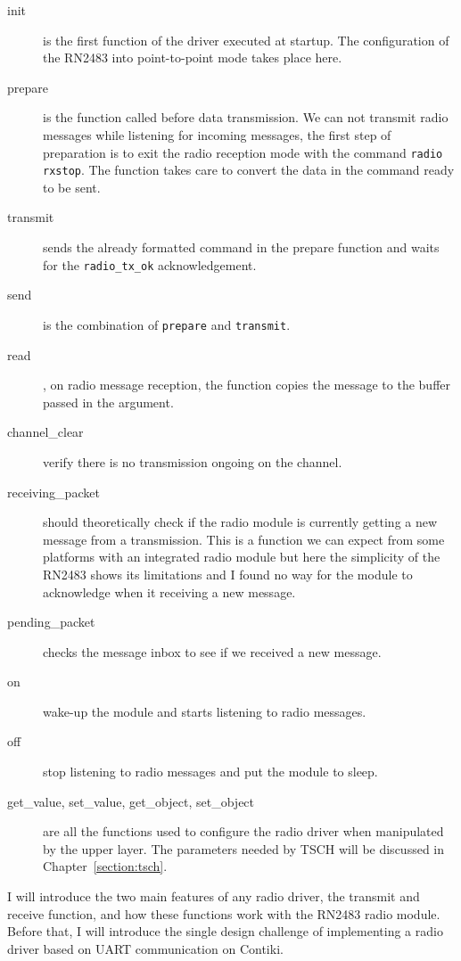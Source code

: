 \begin{description}
  \item[init] is the first function of the driver executed at startup.
    The configuration of the RN2483 into point-to-point mode takes place here.
  \item[prepare] is the function called before data transmission.
    We can not transmit radio messages while listening for incoming messages, the
    first step of preparation is to exit the radio reception mode with the
    command \lstinline{radio rxstop}.
    The function takes care to convert the data in the command ready to be sent.
  \item[transmit] sends the already formatted command in the prepare function and
    waits for the \lstinline{radio_tx_ok} acknowledgement.
  \item[send] is the combination of \lstinline{prepare} and
    \lstinline{transmit}.
  \item[read], on radio message reception, the function copies the
    message to the buffer passed in the argument.
  \item[channel\_clear] verify there is no transmission ongoing on the channel.
  \item[receiving\_packet] should theoretically check if the radio module is
    currently getting a new message from a transmission. This is a function we
    can expect from some platforms with an integrated radio module but here the
    simplicity of the RN2483 shows its limitations and I found no way for the module
    to acknowledge when it receiving a new message.
  \item[pending\_packet] checks the message inbox to see if we received a new
    message.
  \item[on] wake-up the module and starts listening to radio messages.
  \item[off] stop listening to radio messages and put the module to sleep.
  \item[get\_value, set\_value, get\_object, set\_object] are all the functions used
    to configure the radio driver when manipulated by the upper layer.
    The parameters needed by TSCH will be discussed in Chapter~\ref{section:tsch}.
\end{description}

I will introduce the two main features of any radio driver, the transmit and receive
function, and how these functions work with the RN2483 radio module.
Before that, I will introduce the single design challenge of implementing a radio
driver based on UART communication on Contiki.

